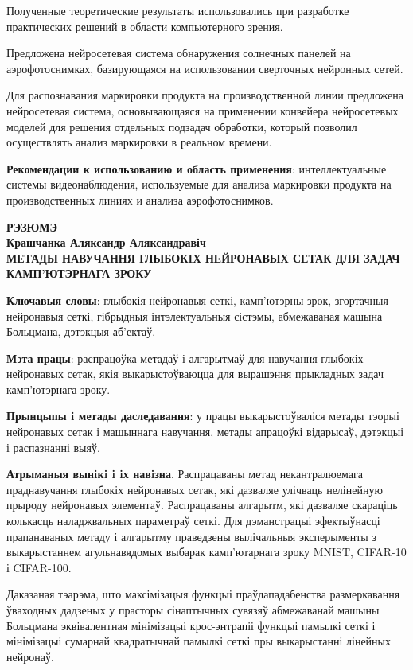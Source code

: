 \documentclass{thesisby}
\begin{document}
Полученные теоретические результаты использовались при разработке практических решений в области компьютерного зрения.

Предложена нейросетевая система обнаружения солнечных панелей на аэрофотоснимках, базирующаяся на использовании сверточных нейронных сетей.

Для распознавания маркировки продукта на производственной линии предложена нейросетевая система, основывающаяся на применении конвейера нейросетевых моделей для решения отдельных подзадач обработки, который позволил осуществлять анализ маркировки в реальном времени.

\textbf{Рекомендации к использованию и область применения}:
интеллектуальные системы видеонаблюдения, используемые для анализа маркировки продукта на производственных линиях и анализа аэрофотоснимков.

\newpage
\begin{center}
\bf РЭЗЮМЭ\\[1mm]\rm Крашчанка Аляксандр Аляксандравіч\\[1mm] \bf МЕТАДЫ НАВУЧАННЯ ГЛЫБОКIХ НЕЙРОНАВЫХ СЕТАК ДЛЯ ЗАДАЧ КАМП'ЮТЭРНАГА ЗРОКУ
\end{center}

{\bf Ключавыя словы}: глыбокія нейронавыя сеткі, камп'ютэрны зрок, згортачныя нейронавыя сеткі, гібрыдныя інтэлектуальныя сістэмы, абмежаваная машына Больцмана, дэтэкцыя аб'екта\u{у}.

\textbf{Мэта працы}: распрацо\u{у}ка метада\u{у} і алгарытма\u{у} для навучання глыбокіх нейронавых сетак, якія выкарысто\u{у}ваюцца для вырашэння прыкладных задач камп'ютэрнага зроку.

\textbf{Прынцыпы i метады даследавання}: у працы выкарысто\u{у}валіся метады тэорыі нейронавых сетак і машыннага навучання, метады апрацо\u{у}кі відарыса\u{у}, дэтэкцыі і распазнанні выя\u{у}.

\textbf{Атрыманыя вынiкi i iх навiзна}.
Распрацаваны метад некантралюемага праднавучання глыбокіх нейронавых сетак, які дазваляе улічваць нелінейную прыроду нейронавых элемента\u{у}. Распрацаваны алгарытм, які дазваляе скараціць колькасць наладжвальных параметра\u{у} сеткі. Для дэманстрацыі эфекты\u{у}насці прапанаваных метаду і алгарытму праведзены вылічальныя эксперыменты з выкарыстаннем агульнавядомых выбарак камп'ютарнага зроку MNIST, CIFAR-10 і CIFAR-100.

Даказаная тэарэма, што максімізацыя функцыі пра\u{у}дападабенства размеркавання \u{у}ваходных дадзеных у прасторы сінаптычных сувязя\u{у} абмежаванай машыны Больцмана эквівалентная мінімізацыі крос-энтрапіі функцыі памылкі сеткі і мінімізацыі сумарнай квадратычнай памылкі сеткі пры выкарыстанні лінейных нейрона\u{у}.
\end{document}
